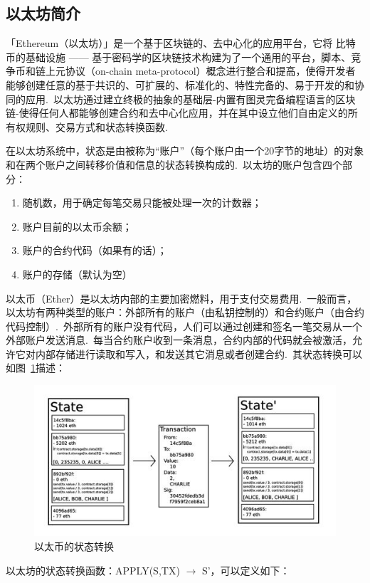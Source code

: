 \documentclass[a4paper,12pt,titlepage]{ctexart}
\begin{document}
\subsection{以太坊简介}
「Ethereum（以太坊）」是一个基于区块链的、去中心化的应用平台，它将 比特币的基础设施 —— 基于密码学的区块链技术构建为了一个通用的平台，脚本、竞争币和链上元协议（on-chain meta-protocol）概念进行整合和提高，使得开发者能够创建任意的基于共识的、可扩展的、标准化的、特性完备的、易于开发的和协同的应用.~以太坊通过建立终极的抽象的基础层-内置有图灵完备编程语言的区块链-使得任何人都能够创建合约和去中心化应用，并在其中设立他们自由定义的所有权规则、交易方式和状态转换函数.~\par
在以太坊系统中，状态是由被称为“账户”（每个账户由一个20字节的地址）的对象和在两个账户之间转移价值和信息的状态转换构成的.~以太坊的账户包含四个部分：
\begin{enumerate}
\item 随机数，用于确定每笔交易只能被处理一次的计数器；
\item 账户目前的以太币余额；
\item 账户的合约代码（如果有的话）；
\item 账户的存储（默认为空）
\end{enumerate}\par
以太币（Ether）是以太坊内部的主要加密燃料，用于支付交易费用.~一般而言，以太坊有两种类型的账户：外部所有的账户（由私钥控制的）和合约账户（由合约代码控制）.~外部所有的账户没有代码，人们可以通过创建和签名一笔交易从一个外部账户发送消息.~每当合约账户收到一条消息，合约内部的代码就会被激活，允许它对内部存储进行读取和写入，和发送其它消息或者创建合约.~其状态转换可以如图~\ref{fig7}描述：\par
\begin{figure}[!hbp]
	\centering
	\includegraphics[scale=0.8]{fig7.jpg}
	\caption{以太币的状态转换}
	\label{fig7}
\end{figure}
以太坊的状态转换函数：APPLY(S,TX) $\rightarrow$ S’，可以定义如下：
\end{document}
